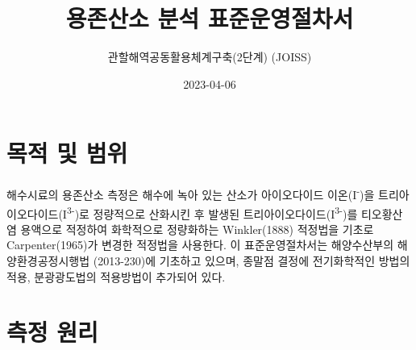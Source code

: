 \documentclass[
]{book}
\title{용존산소 분석 표준운영절차서}
\author{관할해역공동활용체계구축(2단계) (JOISS)}
\date{2023-04-06}
\begin{document}
\maketitle

{
\setcounter{tocdepth}{1}
\tableofcontents
}
\hypertarget{uxbaa9uxc801-uxbc0f-uxbc94uxc704}{%
\chapter{목적 및 범위}\label{uxbaa9uxc801-uxbc0f-uxbc94uxc704}}

해수시료의 용존산소 측정은 해수에 녹아 있는 산소가 아이오다이드 이온(I\textsuperscript{-})을 트리아이오다이드(I\textsuperscript{3-})로 정량적으로 산화시킨 후 발생된 트리아이오다이드(I\textsuperscript{3-})를 티오황산염 용액으로 적정하여 화학적으로 정량화하는 Winkler(1888) 적정법을 기초로 Carpenter(1965)가 변경한 적정법을 사용한다. 이 표준운영절차서는 해양수산부의 해양환경공정시행법 (2013-230)에 기초하고 있으며, 종말점 결정에 전기화학적인 방법의 적용, 분광광도법의 적용방법이 추가되어 있다.

\hypertarget{uxce21uxc815-uxc6d0uxb9ac}{%
\chapter{측정 원리}\label{uxce21uxc815-uxc6d0uxb9ac}}
\end{document}
